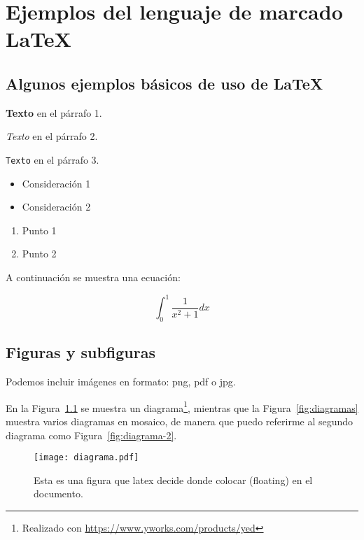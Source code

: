 \chapter{Ejemplos del lenguaje de marcado \LaTeX{}}

\section{Algunos ejemplos básicos de uso de \LaTeX{}}

  \textbf{Texto} en el párrafo 1.

  \textit{Texto} en el párrafo 2.

  \texttt{Texto} en el párrafo 3.


  \begin{itemize}
  \item Consideración 1
  \item Consideración 2
  \end{itemize}

  \vspace{0.5cm}
  
  \begin{enumerate}
  \item Punto 1
  \item Punto 2
  \end{enumerate}
  
A continuación se muestra una ecuación:

  \[ \int_{0}^{1}\frac{1}{x^2+1} dx \]

  \section{Figuras y subfiguras}

  Podemos incluir imágenes en formato: png, pdf o jpg.

  En la Figura~\ref{fig:diagrama} se muestra un diagrama\footnote{Realizado con \href{yed}{https://www.yworks.com/products/yed}}, mientras que la Figura~\ref{fig:diagramas} muestra varios diagramas en mosaico, de manera que puedo referirme al segundo diagrama como Figura~\ref{fig:diagrama-2}.

  \begin{figure}[!htb]
    \centering
    \texttt{[image: diagrama.pdf]}
    \caption{Esta es una figura que latex decide donde colocar (floating) en el documento.}
    \label{fig:diagrama}
  \end{figure}

